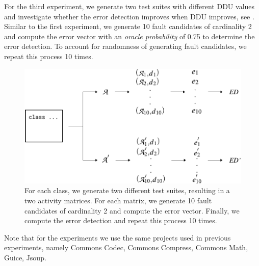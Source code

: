 \documentclass[twoside,a4paper,11pt]{memoir}
\begin{document}
For the third experiment, we generate two test suites with different DDU values and investigate whether the error detection improves when DDU improves, see .
Similar to the first experiment, we generate 10 fault candidates of cardinality 2 and compute the error vector with an \emph{oracle probability} of 0.75 to determine the error detection.
To account for randomness of generating fault candidates, we repeat this process 10 times.
\begin{figure}
  \includegraphics[width=\linewidth]{figures/delta_error_detection_approach}
  \caption{For each class, we generate two different test suites, resulting in a two activity matrices. For each matrix, we generate 10 fault candidates of cardinality 2 and compute the error vector. Finally, we compute the error detection and repeat this process 10 times.}%
  \label{fig:delta_error_detection_approach}
\end{figure}

Note that for the experiments we use the same projects used in previous experiments, namely Commons Codec, Commons Compress, Commons Math, Guice, Jsoup.
\end{document}
